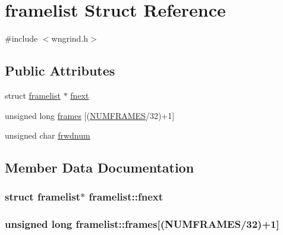 \hypertarget{structframelist}{}\section{framelist Struct Reference}
\label{structframelist}


{\ttfamily \#include $<$wngrind.\+h$>$}

\subsection*{Public Attributes}
\begin{DoxyCompactItemize}
\item 
struct \hyperlink{structframelist}{framelist} $\ast$ \hyperlink{structframelist_ab7604ebc526bd9fa0bdf4acc3cca9ae3}{fnext}
\item 
unsigned long \hyperlink{structframelist_a18ec28e2cbeaac6f6e2529ea25ced4fd}{frames} \mbox{[}(\hyperlink{wn_8h_a4b6b859e1e3f6021a360390be287ca2c}{N\+U\+M\+F\+R\+A\+M\+ES}/32)+1\mbox{]}
\item 
unsigned char \hyperlink{structframelist_af71c96731b860d8287e90f11cae1787b}{frwdnum}
\end{DoxyCompactItemize}


\subsection{Member Data Documentation}
\subsubsection[{\texorpdfstring{fnext}{fnext}}]{\setlength{\rightskip}{0pt plus 5cm}struct {\bf framelist}$\ast$ framelist\+::fnext}\hypertarget{structframelist_ab7604ebc526bd9fa0bdf4acc3cca9ae3}{}\label{structframelist_ab7604ebc526bd9fa0bdf4acc3cca9ae3}
\subsubsection[{\texorpdfstring{frames}{frames}}]{\setlength{\rightskip}{0pt plus 5cm}unsigned long framelist\+::frames\mbox{[}({\bf N\+U\+M\+F\+R\+A\+M\+ES}/32)+1\mbox{]}}\hypertarget{structframelist_a18ec28e2cbeaac6f6e2529ea25ced4fd}{}\label{structframelist_a18ec28e2cbeaac6f6e2529ea25ced4fd}
